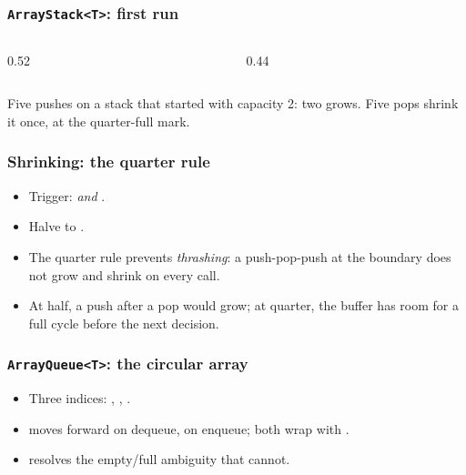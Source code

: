 \documentclass[aspectratio=169,10pt,compress]{beamer}
\begin{document}
\begin{frame}[t,fragile] \frametitle{\texttt{ArrayStack<T>}: first run}
  \begin{columns}[T]
    \begin{column}{0.52\textwidth}
    \end{column}
    \begin{column}{0.44\textwidth}
    \end{column}
  \end{columns}
  \small
  Five pushes on a stack that started with capacity 2: two grows.
  Five pops shrink it once, at the quarter-full mark.
\end{frame}




\begin{frame}[t,fragile] \frametitle{Shrinking: the quarter rule}
  \begin{itemize}\small
    \item Trigger:  \emph{and} .
    \item Halve to .
    \item The quarter rule prevents \emph{thrashing}: a push-pop-push
          at the boundary does not grow and shrink on every call.
    \item At half, a push after a pop would grow; at quarter, the buffer
          has room for a full cycle before the next decision.
  \end{itemize}
\end{frame}





\begin{frame}[t,fragile] \frametitle{\texttt{ArrayQueue<T>}: the circular array}
  \begin{itemize}\small
    \item Three indices: , , .
    \item {} moves forward on dequeue,  on enqueue;
          both wrap with .
    \item {} resolves the empty/full ambiguity that
           cannot.
  \end{itemize}
\end{frame}
\end{document}

